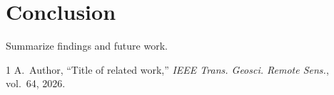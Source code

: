 \documentclass[conference]{IEEEtran}
\begin{document}
\section{Conclusion}
Summarize findings and future work.

%   
%   
\begin{thebibliography}{1}
 A.~Author, ``Title of related work,'' \emph{IEEE Trans. Geosci.
Remote Sens.}, vol.~64, 2026.
\end{thebibliography}
\end{document}
